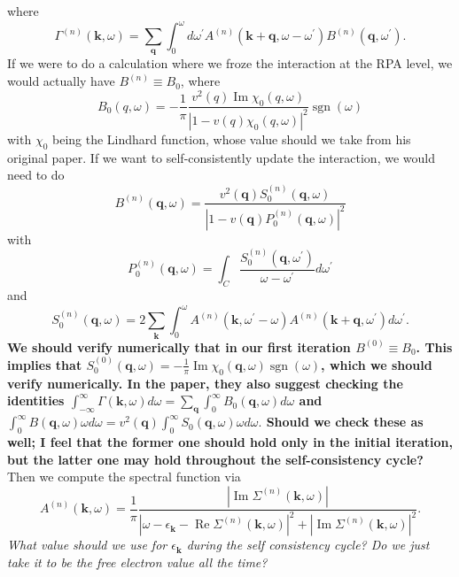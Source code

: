 where
\begin{equation}
\Gamma^{(n)}(\mathbf{k}, \omega)=\sum_{\mathbf{q}} \int_0^\omega d \omega^{\prime} A^{(n)}\left(\mathbf{k}+\mathbf{q}, \omega-\omega^{\prime}\right) B^{(n)}\left(\mathbf{q}, \omega^{\prime}\right).
\end{equation}
If we were to do a calculation where we froze the interaction at the RPA level, we would actually have $B^{(n)}\equiv B_0$, where
\begin{equation}
B_0(q, \omega)=-\frac{1}{\pi} \frac{v^2(q) \operatorname{Im} \chi_0(q, \omega)}{\left|1-v(q) \chi_0(q, \omega)\right|^2} \operatorname{sgn}(\omega)
\end{equation}
with $\chi_0$ being the Lindhard function, whose value should we take from his original paper. If we want to self-consistently update the interaction, we would need to do 
\begin{equation}
    B^{(n)}(\mathbf{q}, \omega)=\frac{v^2(\mathbf{q}) S_0^{(n)}(\mathbf{q}, \omega)}{\left|1-v(\mathbf{q}) P_0^{(n)}(\mathbf{q}, \omega)\right|^2}
\end{equation}
with
\begin{equation}
    P_0^{(n)}(\mathbf{q}, \omega)=\int_C \frac{S_0^{(n)}\left(\mathbf{q}, \omega^{\prime}\right)}{\omega-\omega^{\prime}} d \omega^{\prime}
\end{equation}
and 
\begin{equation}
    S_0^{(n)}(\mathbf{q}, \omega)=2 \sum_{\mathbf{k}} \int_0^\omega A^{(n)}\left(\mathbf{k}, \omega^{\prime}-\omega\right) A^{(n)}\left(\mathbf{k}+\mathbf{q}, \omega^{\prime}\right) d \omega^{\prime}.
\end{equation}
\textbf{We should verify numerically that in our first iteration $B^{(0)}\equiv B_0$. This implies that $S_0^{(0)}(\mathbf{q}, \omega) = -\frac{1}{\pi} \operatorname{Im} \chi_0(\mathbf{q}, \omega) \operatorname{sgn}(\omega)$, which we should verify numerically. In the paper, they also suggest checking the identities $\int_{-\infty}^{\infty} \Gamma(\mathbf{k}, \omega) d \omega=\sum_{\mathbf{q}} \int_0^{\infty} B_0(\mathbf{q}, \omega) d \omega$ and $\int_0^{\infty} B(\mathbf{q}, \omega) \omega d \omega=v^2(\mathbf{q}) \int_0^{\infty} S_0(\mathbf{q}, \omega) \omega d \omega.$ Should we check these as well; I feel that the former one should hold only in the initial iteration, but the latter one may hold throughout the self-consistency cycle?} Then we compute the spectral function via
\begin{equation}
    A^{(n)}(\mathbf{k}, \omega)=\frac{1}{\pi} \frac{\left|\operatorname{Im} \Sigma^{(n)}(\mathbf{k}, \omega)\right|}{\left|\omega-\epsilon_{\mathbf{k}}-\operatorname{Re} \Sigma^{(n)}(\mathbf{k}, \omega)\right|^2+\left|\operatorname{Im} \Sigma^{(n)}(\mathbf{k}, \omega)\right|^2}.
\end{equation}
\emph{What value should we use for $\epsilon_{\mathbf{k}}$ during the self consistency cycle? Do we just take it to be the free electron value all the time? }
